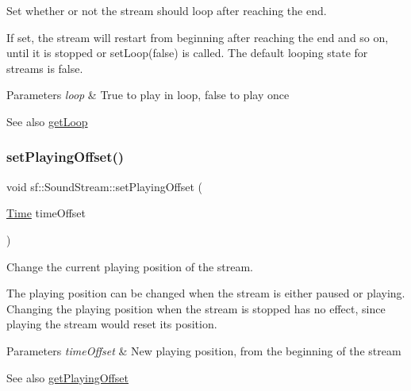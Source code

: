 Set whether or not the stream should loop after reaching the end. 

If set, the stream will restart from beginning after reaching the end and so on, until it is stopped or set\+Loop(false) is called. The default looping state for streams is false.


\begin{DoxyParams}{Parameters}
{\em loop} & True to play in loop, false to play once\\
\hline
\end{DoxyParams}
\begin{DoxySeeAlso}{See also}
\hyperlink{classsf_1_1_sound_stream_a49d263f9bbaefec4b019bd05fda59b25}{get\+Loop} 
\end{DoxySeeAlso}
\mbox{\label{classsf_1_1_sound_stream_af416a5f84c8750d2acb9821d78bc8646}} 
\subsubsection{\texorpdfstring{set\+Playing\+Offset()}{setPlayingOffset()}}
{\footnotesize\ttfamily void sf\+::\+Sound\+Stream\+::set\+Playing\+Offset (\begin{DoxyParamCaption}\item[{\hyperlink{classsf_1_1_time}{Time}}]{time\+Offset }\end{DoxyParamCaption})}



Change the current playing position of the stream. 

The playing position can be changed when the stream is either paused or playing. Changing the playing position when the stream is stopped has no effect, since playing the stream would reset its position.


\begin{DoxyParams}{Parameters}
{\em time\+Offset} & New playing position, from the beginning of the stream\\
\hline
\end{DoxyParams}
\begin{DoxySeeAlso}{See also}
\hyperlink{classsf_1_1_sound_stream_ae288f3c72edbad9cc7ee938ce5b907c1}{get\+Playing\+Offset} 
\end{DoxySeeAlso}
\mbox{\label{classsf_1_1_sound_stream_a16cc6a0404b32e42c4dce184bb94d0f4}} 
